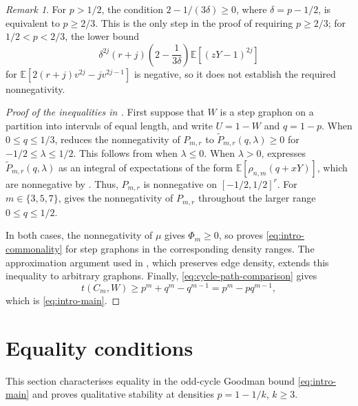 \documentclass[11pt]{article}
\theoremstyle{remark}
\newtheorem{remark}[theorem]{Remark}
\numberwithin{equation}{section}
\newcommand{\E}{\mathbb E}
\newcommand{\tC}[2]{t(C_{#1},#2)}
\begin{document}
\begin{remark}\label{rem:pge23-threshold}
  For $p>1/2$, the condition $2-1/(3\delta)\ge0$, where
  $\delta=p-1/2$, is equivalent to $p\ge2/3$.
  This is the only step in the proof of 
  requiring $p\ge2/3$; for $1/2<p<2/3$, the lower bound
  \[
    \delta^{2j}(r+j)\left(2-\frac{1}{3\delta}\right)
    \E\left[(zY-1)^{2j}\right]
  \]
  for $\E\left[2(r+j)v^{2j}-jv^{2j-1}\right]$ is negative, so it does
  not establish the required nonnegativity.
\end{remark}

\medskip

\begin{proof}[Proof of the inequalities in ]
  First suppose that $W$ is a step graphon on a partition into intervals of equal length, and write $U=1-W$ and $q=1-p$.
  When $0\le q\le1/3$,  reduces the nonnegativity of $P_{m,r}$ to
  $\widetilde P_{m,r}(q,\lambda)\ge0$ for $-1/2\le\lambda\le1/2$.
  This follows from  when $\lambda\le0$.
  When $\lambda>0$,  expresses
  $\widetilde P_{m,r}(q,\lambda)$ as an integral of expectations of the form
  $\E\left[\rho_{n,m}(q+xY)\right]$, which are nonnegative by
  .
  Thus, $P_{m,r}$ is nonnegative on $[-1/2,1/2]^r$.
  For $m\in\{3,5,7\}$,  gives the nonnegativity of $P_{m,r}$ throughout the larger range $0\le q\le1/2$.

  In both cases, the nonnegativity of $\mu$ gives $\Phi_m\ge0$, so  proves \eqref{eq:intro-commonality} for step graphons in the corresponding density ranges.
  The approximation argument used in , which preserves edge density, extends this inequality to arbitrary graphons.
  Finally, \eqref{eq:cycle-path-comparison} gives
  \[
    \tC mW\ge p^m+q^m-q^{m-1}=p^m-pq^{m-1},
  \]
  which is \eqref{eq:intro-main}.
\end{proof}

\section{Equality conditions}
\label{sec:equality-stability}

This section characterises equality in the odd-cycle Goodman bound
\eqref{eq:intro-main} and proves qualitative stability at densities
$p=1-1/k$, $k\ge3$.
\end{document}

